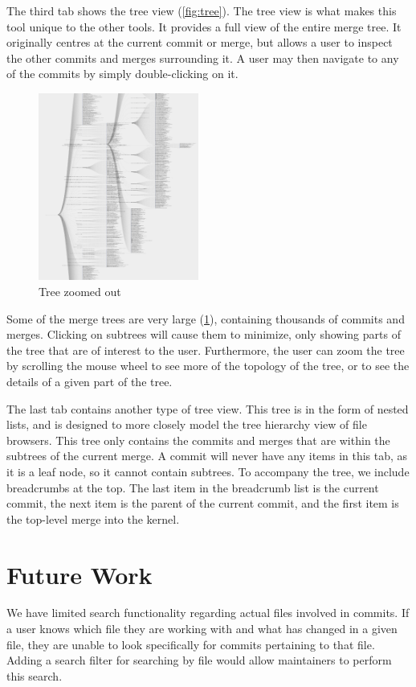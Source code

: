 \documentclass[conference, draftclsnofoot]{IEEEtran}
\begin{document}
The third tab shows the tree view (\ref{fig:tree}). The tree view is what makes
this tool unique to the other tools. It provides a full view of the entire
merge tree. It originally centres at the current commit or merge, but allows a
user to inspect the other commits and merges surrounding it. A user may then
navigate to any of the commits by simply double-clicking on it.

\begin{figure}[h]
	\centering
	\includegraphics[width=0.47\textwidth]{figures/tree_zoom.png}
	\caption{Tree zoomed out}
	\label{fig:zoomed_tree}
\end{figure}

Some of the merge trees are very large (\ref{fig:zoomed_tree}), containing
thousands of commits and merges. Clicking on subtrees will cause them to
minimize, only showing parts of the tree that are of interest to the user.
Furthermore, the user can zoom the tree by scrolling the mouse wheel to see
more of the topology of the tree, or to see the details of a given part of the
tree.

The last tab contains another type of tree view. This tree is in the form of
nested lists, and is designed to more closely model the tree hierarchy view of
file browsers. This tree only contains the commits and merges that are within
the subtrees of the current merge. A commit will never have any items in this
tab, as it is a leaf node, so it cannot contain subtrees. To accompany the
tree, we include breadcrumbs at the top. The last item in the breadcrumb list
is the current commit, the next item is the parent of the current commit, and
the first item is the top-level merge into the kernel.



\section{Future Work}
We have limited search functionality regarding actual files involved in
commits. If a user knows which file they are working with and what has changed
in a given file, they are unable to look specifically for commits pertaining to
that file. Adding a search filter for searching by file would allow maintainers
to perform this search.
\end{document}
